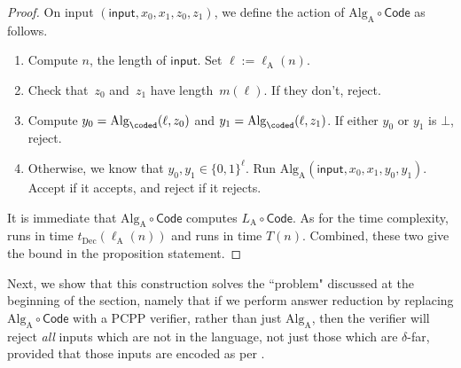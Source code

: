\begin{proof}
On input $(\mathsf{input}, x_0, x_1, z_0, z_1)$, we define the action of $\mathrm{Alg}_{\mathrm{A}} \circ \mathsf{Code}$ as follows.
\begin{enumerate}
\item Compute $n$, the length of $\mathsf{input}$. Set $\ell := \ell_{\mathrm{A}}(n)$.
\item Check that~$z_0$ and~$z_1$ have length~$m(\ell)$. If they don't, reject.
\item Compute $y_0 = \mathrm{Alg}_{\coded}(\ell, z_0)$ and $y_1 = \mathrm{Alg}_{\coded}(\ell, z_1)$. If either $y_0$ or $y_1$ is $\bot$, reject.\label{item:decode-that-string}
\item Otherwise, we know that $y_0, y_1 \in \{0, 1\}^\ell$.  Run $\mathrm{Alg}_{\mathrm{A}}(\mathsf{input}, x_0, x_1, y_0, y_1)$. Accept if it accepts, and reject if it rejects.\label{item:run-that-algorithm}
\end{enumerate}
It is immediate that $\mathrm{Alg}_{\mathrm{A}} \circ \mathsf{Code}$ computes $L_{\mathrm{A}} \circ \mathsf{Code}$.
As for the time complexity,  runs in time $t_{\mathrm{Dec}}(\ell_{\mathrm{A}}(n))$ 
and  runs in time $T(n)$.
Combined, these two give the bound in the proposition statement.
\end{proof}

Next, we show that this construction solves the ``problem" discussed at the beginning of the section,
namely that if we perform answer reduction by replacing $\mathrm{Alg}_{\mathrm{A}} \circ \mathsf{Code}$ with a PCPP verifier,
rather than just $\mathrm{Alg}_{\mathrm{A}}$, then the verifier will reject \emph{all} inputs which are not in the language,
not just those which are $\delta$-far, provided that those inputs are encoded as per .


